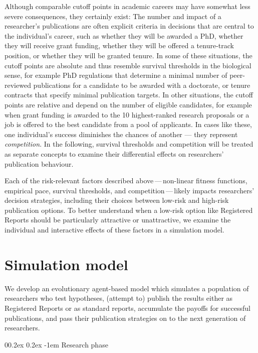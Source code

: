 \documentclass[
  ,man,mask,floatsintext]{apa6}
\makeatletter
\let\oldparagraph\paragraph
\renewcommand{\paragraph}[1]{\oldparagraph{#1}\mbox{}}
\renewcommand{\paragraph}{\@startsection{paragraph}{4}{\parindent}%
  {0\baselineskip \@plus 0.2ex \@minus 0.2ex}%
  {-1em}%
  {\normalfont\normalsize\bfseries\itshape\typesectitle}}
\makeatother
\begin{document}
Although comparable cutoff points in academic careers may have somewhat less severe consequences, they certainly exist:
The number and impact of a researcher's publications are often explicit criteria in decisions that are central to the individual's career, such as whether they will be awarded a PhD, whether they will receive grant funding, whether they will be offered a tenure-track position, or whether they will be granted tenure.
In some of these situations, the cutoff points are absolute and thus resemble survival thresholds in the biological sense, for example PhD regulations that determine a minimal number of peer-reviewed publications for a candidate to be awarded with a doctorate, or tenure contracts that specify minimal publication targets.
In other situations, the cutoff points are relative and depend on the number of eligible candidates, for example when grant funding is awarded to the 10 highest-ranked research proposals or a job is offered to the best candidate from a pool of applicants.
In cases like these, one individual's success diminishes the chances of another --- they represent \emph{competition}.
In the following, survival thresholds and competition will be treated as separate concepts to examine their differential effects on researchers' publication behaviour.

Each of the risk-relevant factors described above\(\,\)---\(\,\)non-linear fitness functions, empirical pace, survival thresholds, and competition\(\,\)---\(\,\)likely impacts researchers' decision strategies, including their choices between low-risk and high-risk publication options.
To better understand when a low-risk option like Registered Reports should be particularly attractive or unattractive, we examine the individual and interactive effects of these factors in a simulation model.

\hypertarget{simulation-model}{%
\section{Simulation model}\label{simulation-model}}

We develop an evolutionary agent-based model which simulates a population of researchers who test hypotheses, (attempt to) publish the results either as Registered Reports or as standard reports, accumulate the payoffs for successful publications, and pass their publication strategies on to the next generation of researchers.

\hypertarget{research-phase}{%
\paragraph{Research phase}\label{research-phase}}
\end{document}

